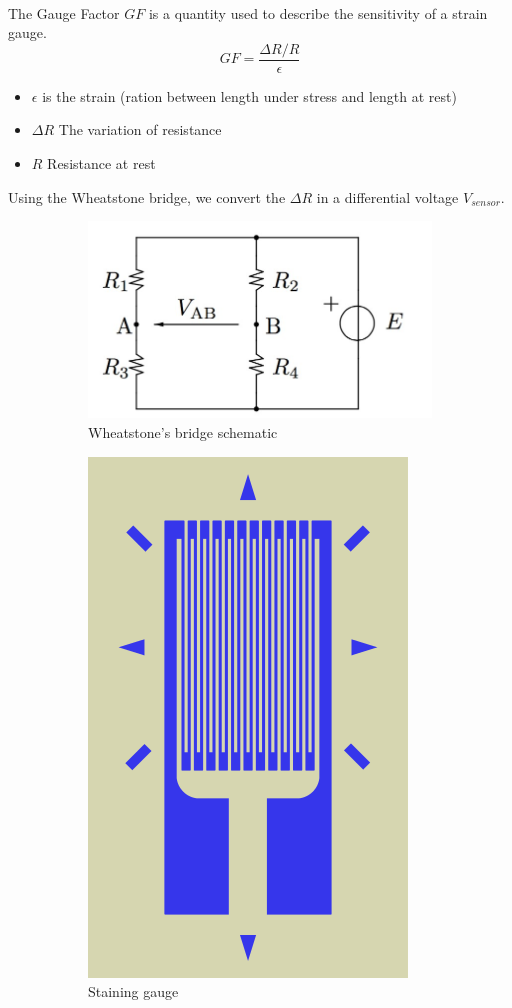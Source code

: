 \documentclass{article}[12pt]
\begin{document}
\paragraph{}
The Gauge Factor $GF$ is a quantity used to describe the sensitivity of a strain gauge.
\begin{equation}
GF=\dfrac{\Delta R/R}{\epsilon}
\end{equation}
\begin{itemize}
\item $\epsilon$ is the strain (ration between length under stress and length at rest)
\item $\Delta R$ The variation of resistance
\item $R$ Resistance at rest
\end{itemize}
Using the Wheatstone bridge, we convert the $\Delta R$ in a differential voltage $V_{sensor}$.
\begin{figure}[H]
\centering
\begin{subfigure}{.5\textwidth}
  \centering
  \includegraphics[width=.8\linewidth]{figures/wheatstone.jpg}
  \caption{Wheatstone's bridge schematic}
  \label{fig:Wheatstone}
\end{subfigure}%
\begin{subfigure}{.5\textwidth}
  \centering
  \includegraphics[width=.4\linewidth]{figures/Strain_gauge.png}
  \caption{Staining gauge}
  \label{fig:sub2}
\end{subfigure}
\caption{}
\label{fig:test}
\end{figure}
\end{document}
